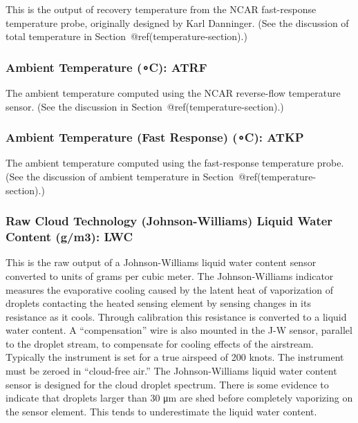\documentclass[
  english,
]{book}
\begin{document}
This is the output of recovery temperature from the NCAR fast-response
temperature probe, originally designed by Karl Danninger. (See the
discussion of total temperature in Section~@ref(temperature-section).)

\hypertarget{atrf}{%
\subsubsection*{\texorpdfstring{Ambient Temperature ({∘C}):
ATRF}{Ambient Temperature (∘C): ATRF}}\label{atrf}}

The ambient temperature computed using the NCAR reverse-flow temperature
sensor. (See the discussion in Section~@ref(temperature-section).)

\hypertarget{atkp}{%
\subsubsection*{\texorpdfstring{Ambient Temperature (Fast Response)
({∘C}):
ATKP}{Ambient Temperature (Fast Response) (∘C): ATKP}}\label{atkp}}

The ambient temperature computed using the fast-response temperature
probe. (See the discussion of ambient temperature in
Section~@ref(temperature-section).)

\hypertarget{jwlwc}{%
\subsubsection*{\texorpdfstring{Raw Cloud Technology (Johnson-Williams)
Liquid Water Content ({g/m3}):
LWC}{Raw Cloud Technology (Johnson-Williams) Liquid Water Content (g/m3): LWC}}\label{jwlwc}}

This is the raw output of a Johnson-Williams liquid water content sensor
converted to units of grams per cubic meter. The Johnson-Williams
indicator measures the evaporative cooling caused by the latent heat of
vaporization of droplets contacting the heated sensing element by
sensing changes in its resistance as it cools. Through calibration this
resistance is converted to a liquid water content. A ``compensation''
wire is also mounted in the J-W sensor, parallel to the droplet stream,
to compensate for cooling effects of the airstream. Typically the
instrument is set for a true airspeed of 200 knots. The instrument must
be zeroed in ``cloud-free air.'' The Johnson-Williams liquid water
content sensor is designed for the cloud droplet spectrum. There is some
evidence to indicate that droplets larger than 30 {μm} are shed before
completely vaporizing on the sensor element. This tends to underestimate
the liquid water content.
\end{document}
